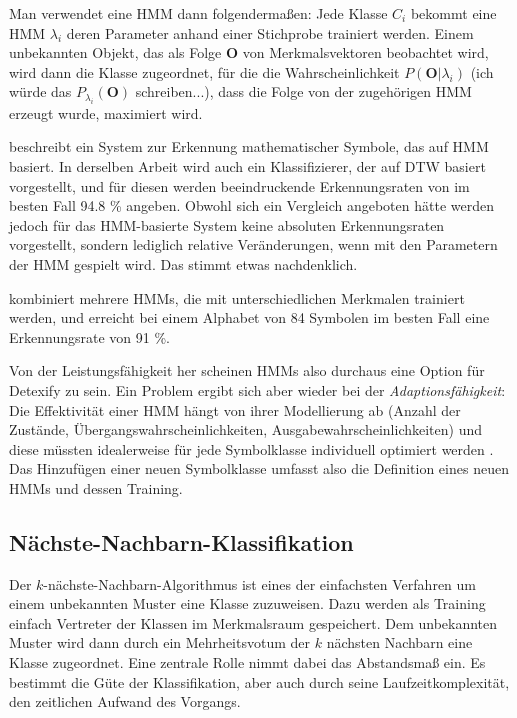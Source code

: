 Man verwendet eine HMM dann folgendermaßen: Jede Klasse $C_i$ bekommt eine HMM $\lambda_i$ deren Parameter anhand einer Stichprobe trainiert werden. Einem unbekannten Objekt, das als Folge $\mathbf{O}$ von Merkmalsvektoren beobachtet wird, wird dann die Klasse zugeordnet, für die die Wahrscheinlichkeit $P(\mathbf{O}|\lambda_i)$ (\TODO ich würde das $P_{\lambda_i}(\mathbf{O})$ schreiben...), dass die Folge von der zugehörigen HMM erzeugt wurde, maximiert wird.

\citet{Xie:2007p11427} beschreibt ein System zur Erkennung mathematischer Symbole, das auf HMM basiert. In derselben Arbeit wird auch ein Klassifizierer, der auf DTW basiert vorgestellt, und für diesen werden beeindruckende Erkennungsraten von im besten Fall 94.8 \% angeben. Obwohl sich ein Vergleich angeboten hätte werden jedoch für das HMM-basierte System keine absoluten Erkennungsraten vorgestellt, sondern lediglich relative Veränderungen, wenn mit den Parametern der HMM gespielt wird. Das stimmt etwas nachdenklich.

\citet{Winkler:1996p11716} kombiniert mehrere HMMs, die mit unterschiedlichen Merkmalen trainiert werden, und erreicht bei einem Alphabet von 84 Symbolen im besten Fall eine Erkennungsrate von 91 \%.

Von der Leistungsfähigkeit her scheinen HMMs also durchaus eine Option für Detexify zu sein. Ein Problem ergibt sich aber wieder bei der \emph{Adaptionsfähigkeit}: Die Effektivität einer HMM hängt von ihrer Modellierung ab (Anzahl der Zustände, Übergangswahrscheinlichkeiten, Ausgabewahrscheinlichkeiten) und diese müssten idealerweise für jede Symbolklasse individuell optimiert werden \cite{Fitzgerald:2005p331}. Das Hinzufügen einer neuen Symbolklasse umfasst also die Definition eines neuen HMMs und dessen Training.

\subsection{Nächste-Nachbarn-Klassifikation} \label{sub:knn}

Der $k$-nächste-Nachbarn-Algorithmus ist eines der einfachsten Verfahren um einem unbekannten Muster eine Klasse zuzuweisen. Dazu werden als Training einfach Vertreter der Klassen im Merkmalsraum gespeichert. Dem unbekannten Muster wird dann durch ein Mehrheitsvotum der $k$ nächsten Nachbarn eine Klasse zugeordnet. Eine zentrale Rolle nimmt dabei das Abstandsmaß ein. Es bestimmt die Güte der Klassifikation, aber auch durch seine Laufzeitkomplexität, den zeitlichen Aufwand des Vorgangs.

